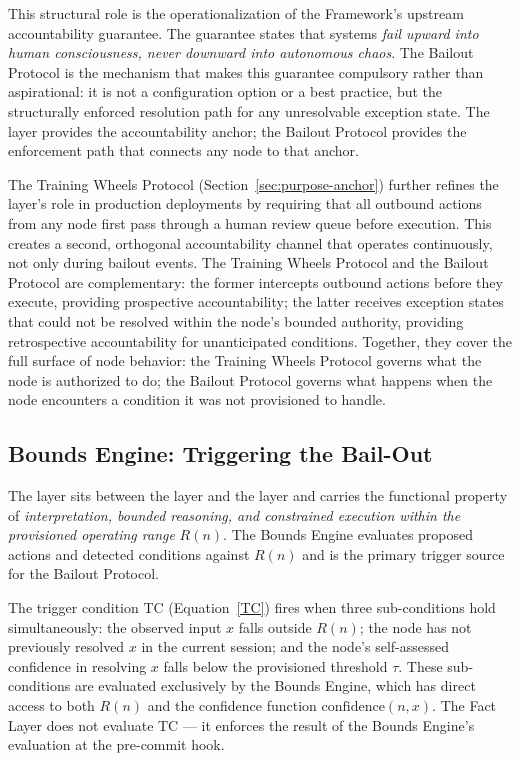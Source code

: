This structural role is the operationalization of the \bxthree{} Framework's upstream accountability guarantee. The guarantee states that \bxthree{} systems \emph{fail upward into human consciousness, never downward into autonomous chaos}. The Bailout Protocol is the mechanism that makes this guarantee compulsory rather than aspirational: it is not a configuration option or a best practice, but the structurally enforced resolution path for any unresolvable exception state. The \purpose{} layer provides the accountability anchor; the Bailout Protocol provides the enforcement path that connects any node to that anchor.

The Training Wheels Protocol (Section~\ref{sec:purpose-anchor}) further refines the \purpose{} layer's role in production deployments by requiring that all outbound actions from any node first pass through a human review queue before execution. This creates a second, orthogonal accountability channel that operates continuously, not only during bailout events. The Training Wheels Protocol and the Bailout Protocol are complementary: the former intercepts outbound actions before they execute, providing prospective accountability; the latter receives exception states that could not be resolved within the node's bounded authority, providing retrospective accountability for unanticipated conditions. Together, they cover the full surface of node behavior: the Training Wheels Protocol governs what the node is authorized to do; the Bailout Protocol governs what happens when the node encounters a condition it was not provisioned to handle.

\subsection{Bounds Engine: Triggering the Bail-Out}
\label{sec:bounds-engine-trigger}

The \bounds{} layer sits between the \purpose{} layer and the \fact{} layer and carries the functional property of \emph{interpretation, bounded reasoning, and constrained execution within the provisioned operating range} $R(n)$. The Bounds Engine evaluates proposed actions and detected conditions against $R(n)$ and is the primary trigger source for the Bailout Protocol.

The trigger condition TC (Equation~\ref{TC}) fires when three sub-conditions hold simultaneously: the observed input $x$ falls outside $R(n)$; the node has not previously resolved $x$ in the current session; and the node's self-assessed confidence in resolving $x$ falls below the provisioned threshold $\tau$. These sub-conditions are evaluated exclusively by the Bounds Engine, which has direct access to both $R(n)$ and the confidence function $\text{confidence}(n, x)$. The Fact Layer does not evaluate TC --- it enforces the result of the Bounds Engine's evaluation at the pre-commit hook.

